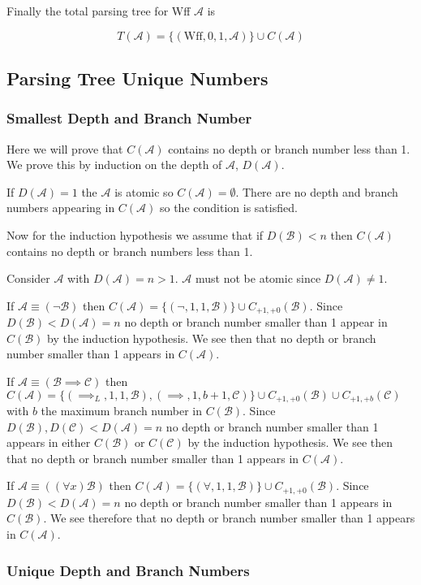 \documentclass[12pt]{article}
\theoremstyle{break}
\theoremstyle{break}
\theoremstyle{break}
\theoremstyle{break}
\newcommand{\mc}[1]{\mathcal{#1}}
\begin{document}
Finally the total parsing tree for Wff $\mc{A}$ is

$$
T(\mc{A}) = \{(\text{Wff}, 0, 1, \mc{A})\} \cup C(\mc{A})
$$

\subsection{Parsing Tree Unique Numbers}

\subsubsection{Smallest Depth and Branch Number}
Here we will prove that $C(\mc{A})$ contains no depth or branch number less than 1. We prove this by induction on the depth of $\mc{A}$, $D(\mc{A})$.

If $D(\mc{A}) = 1$ the $\mc{A}$ is atomic so $C(\mc{A}) = \emptyset$. There are no depth and branch numbers appearing in $C(\mc{A})$ so the condition is satisfied.

Now for the induction hypothesis we assume that if $D(\mc{B}) < n$ then $C(\mc{A})$ contains no depth or branch numbers less than 1.

Consider $\mc{A}$ with $D(\mc{A}) = n > 1$. $\mc{A}$ must not be atomic since $D(\mc{A}) \neq 1$.

If $\mc{A} \equiv (\lnot \mc{B})$ then $C(\mc{A}) = \{(\lnot, 1, 1, \mc{B})\} \cup C_{+1, +0}(\mc{B})$. Since $D(\mc{B}) < D(\mc{A}) = n$ no depth or branch number smaller than 1 appear in $C(\mc{B})$ by the induction hypothesis. We see then that no depth or branch number smaller than 1 appears in $C(\mc{A})$.

If $\mc{A} \equiv (\mc{B} \implies \mc{C})$ then $C(\mc{A}) = \{(\implies_L, 1, 1, \mc{B}), (\implies, 1, b+1, \mc{C})\} \cup C_{+1, +0}(\mc{B}) \cup C_{+1, +b}(\mc{C})$ with $b$ the maximum branch number in $C(\mc{B})$. Since $D(\mc{B}), D(\mc{C}) < D(\mc{A}) = n$ no depth or branch number smaller than 1 appears in either $C(\mc{B})$ or $C(\mc{C})$ by the induction hypothesis. We see then that no depth or branch number smaller than 1 appears in $C(\mc{A})$.

If $\mc{A} \equiv ((\forall x)\mc{B})$ then $C(\mc{A}) = \{(\forall, 1, 1, \mc{B})\} \cup C_{+1, +0}(\mc{B})$. Since $D(\mc{B}) < D(\mc{A}) = n$ no depth or branch number smaller than 1 appears in $C(\mc{B})$. We see therefore that no depth or branch number smaller than 1 appears in $C(\mc{A})$.

\subsubsection{Unique Depth and Branch Numbers}
\end{document}
